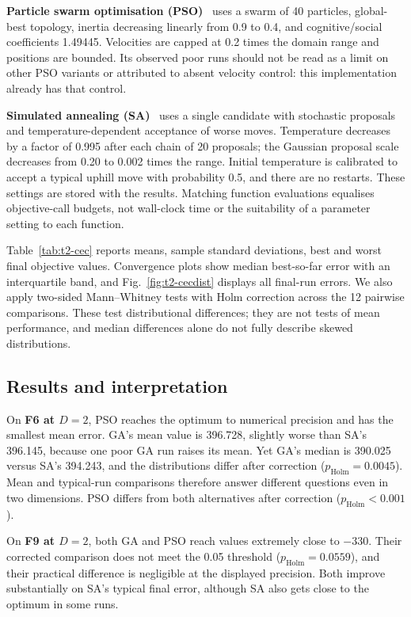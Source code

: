 \textbf{Particle swarm optimisation (PSO)}~\cite{kennedy1995} uses a swarm of 40 particles,
global-best topology, inertia decreasing linearly from 0.9 to 0.4, and cognitive/social
coefficients 1.49445. Velocities are capped at 0.2 times the domain range and positions are
bounded. Its observed poor runs should not be read as a limit on other PSO variants or
attributed to absent velocity control: this implementation already has that control.

\textbf{Simulated annealing (SA)}~\cite{kirkpatrick1983} uses a single candidate with stochastic
proposals and temperature-dependent acceptance of worse moves. Temperature decreases by a
factor of 0.995 after each chain of 20 proposals; the Gaussian proposal scale decreases from
0.20 to 0.002 times the range. Initial temperature is calibrated to accept a typical uphill
move with probability 0.5, and there are no restarts. These settings are stored with the results.
Matching function evaluations
equalises objective-call budgets, not wall-clock time or the suitability of a parameter setting
to each function.

Table~\ref{tab:t2-cec} reports means, sample standard deviations, best and worst final objective
values. Convergence plots show median best-so-far error with an interquartile band, and
Fig.~\ref{fig:t2-cecdist} displays all final-run errors. We also apply two-sided Mann--Whitney
tests with Holm correction across the 12 pairwise comparisons. These test distributional
differences; they are not tests of mean performance, and median differences alone do not
fully describe skewed distributions.



\subsection{Results and interpretation}
On \textbf{F6 at $D=2$}, PSO reaches the optimum to numerical precision and has the smallest
mean error. GA's mean value is 396.728, slightly worse than SA's 396.145, because one poor
GA run raises its mean. Yet GA's median is 390.025 versus SA's 394.243, and the distributions
differ after correction ($p_{\mathrm{Holm}}=0.0045$). Mean and typical-run comparisons therefore
answer different questions even in two dimensions. PSO differs from both alternatives after
correction ($p_{\mathrm{Holm}}<0.001$).

On \textbf{F9 at $D=2$}, both GA and PSO reach values extremely close to $-330$. Their
corrected comparison does not meet the 0.05 threshold ($p_{\mathrm{Holm}}=0.0559$), and their
practical difference is negligible at the displayed precision. Both improve substantially on
SA's typical final error, although SA also gets close to the optimum in some runs.

